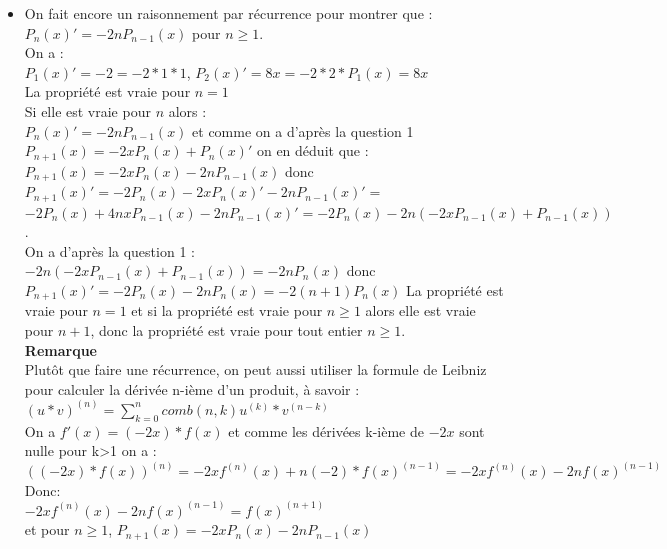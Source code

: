\documentclass[a4paper,11pt]{book}
\begin{document}
\begin{itemize}
La propri\'et\'e est vraie pour $n=0$ et si la propri\'et\'e est vraie pour $n$ 
alors elle est vraie pour $n+1$, donc la propri\'et\'e est vraie pour tout 
entier naturel et on a $P_{n+1}(x)=-2xP_n(x)+P_{n}(x)'$
De plus si $P_n$ est pair (resp impair), $2xP_n(x)$ et$P_{n}(x)'$ sont impairs 
(resp pairs) donc $P_{n+1}(x)$ est impair (resp pair). Comme $P_0(x)=1$ est pair
on en d\'eduit que $P_n(x)$ est pair (resp impair) si $n$ est pair (resp impair).
\item On fait encore un raisonnement par r\'ecurrence pour montrer que :
$P_n(x)'=-2nP_{n-1}(x)$ pour $n\geq 1$.\\
On a :\\
$P_1(x)'=-2=-2*1*1$, $P_2(x)'=8x=-2*2*P_1(x)=8x$\\
La propri\'et\'e est vraie pour $n=1$\\
Si elle est vraie pour $n$ alors :\\
$P_n(x)'=-2nP_{n-1}(x)$ et comme on a d'apr\`es la question 1
$P_{n+1}(x)=-2xP_n(x)+P_{n}(x)'$ on en d\'eduit que :\\
$P_{n+1}(x)=-2xP_n(x)-2nP_{n-1}(x)$ donc\\
$P_{n+1}(x)'=-2P_n(x)-2xP_n(x)'-2nP_{n-1}(x)'=$\\
$-2P_n(x)+4nxP_{n-1}(x)-2nP_{n-1}(x)'=-2P_n(x)-2n(-2xP_{n-1}(x)+P_{n-1}(x))$.\\
On a d'apr\`es la question 1 :\
$-2n(-2xP_{n-1}(x)+P_{n-1}(x))=-2nP_n(x)$ donc\\
$P_{n+1}(x)'=-2P_n(x)-2nP_n(x)=-2(n+1)P_n(x)$
La propri\'et\'e est vraie pour $n=1$ et si la propri\'et\'e est vraie pour 
$n\geq 1$ alors elle est vraie pour $n+1$, donc la propri\'et\'e est vraie pour  tout entier $n\geq 1$.\\
{\bf Remarque}\\
Plut\^ot que faire une r\'ecurrence, on peut aussi utiliser la formule de 
Leibniz pour calculer la d\'eriv\'ee n-i\`eme d'un produit, \`a savoir :\\
$(u*v)^{(n)}=\sum_{k=0}^ncomb(n,k)u^{(k)}*v^{(n-k)}$\\
On a $f'(x)=(-2x)*f(x)$  et comme les d\'eriv\'ees k-i\`eme de $-2x$ sont nulle pour k>1 on a :\\
$((-2x)*f(x))^{(n)}=-2xf^{(n)}(x)+n(-2)*f(x)^{(n-1)}=-2xf^{(n)}(x)-2nf(x)^{(n-1)}$\\
Donc:\\
$-2xf^{(n)}(x)-2nf(x)^{(n-1)}=f(x)^{(n+1)}$\\
et pour $n\geq 1$, $P_{n+1}(x)=-2xP_n(x)-2nP_{n-1}(x)$ 


\end{itemize}
\end{document}
